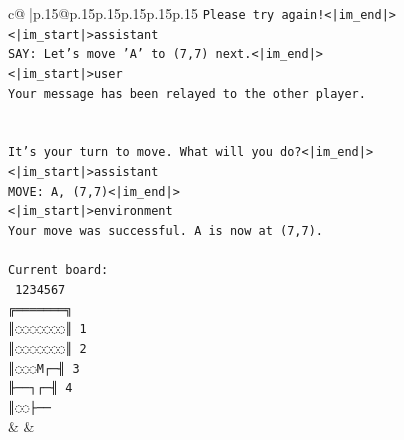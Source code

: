 \documentclass{article}
\begin{document}
{\begin{supertabular}{c@{$\;$}|p{.15\linewidth}@{}p{.15\linewidth}p{.15\linewidth}p{.15\linewidth}p{.15\linewidth}p{.15\linewidth}}
{{{\texttt{Please try again!<|im\_end|>} \\
\texttt{<|im\_start|>assistant} \\
\texttt{SAY: Let's move 'A' to (7,7) next.<|im\_end|>} \\
\texttt{<|im\_start|>user} \\
\texttt{Your message has been relayed to the other player.} \\
\\ 
\\ 
\texttt{It's your turn to move. What will you do?<|im\_end|>} \\
\texttt{<|im\_start|>assistant} \\
\texttt{MOVE: A, (7,7)<|im\_end|>} \\
\texttt{<|im\_start|>environment} \\
\texttt{Your move was successful. A is now at (7,7).} \\
\\ 
\texttt{Current board:} \\
\texttt{ 1234567} \\
\texttt{╔═══════╗} \\
\texttt{║◌◌◌◌◌◌◌║ 1} \\
\texttt{║◌◌◌◌◌◌◌║ 2} \\
\texttt{║◌◌◌M┌─╢ 3} \\
\texttt{╟──┐┌─╢ 4} \\
\texttt{║◌◌├──} \\
            }
        }
    }
    & & \\ \\


\end{supertabular}}
\end{document}
